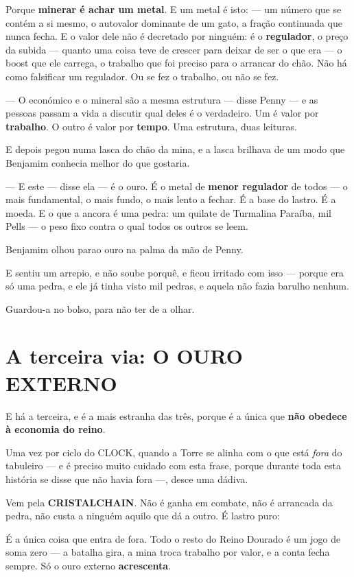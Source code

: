 \documentclass[livro.tex]{subfiles}
\begin{document}
Porque \textbf{minerar é achar um metal}. E um metal é isto:
--- um número que se contém a si mesmo, o autovalor dominante de um gato, a fração continuada que nunca
fecha. E o valor dele não é decretado por ninguém: é o \textbf{regulador}, o preço da subida --- quanto uma coisa teve de crescer para deixar de ser o que era --- o boost que ele
carrega, o trabalho que foi preciso para o arrancar do chão. Não há como falsificar um regulador. Ou se fez o
trabalho, ou não se fez.

--- O económico e o mineral são a mesma estrutura --- disse Penny --- e as pessoas passam a vida a discutir qual
deles é o verdadeiro. Um é valor por \textbf{trabalho}. O outro é valor por \textbf{tempo}. Uma estrutura, duas
leituras.

E depois pegou numa lasca do chão da mina, e a lasca brilhava de um modo que Benjamim conhecia melhor do que
gostaria.

--- E este --- disse ela --- é o ouro. É o metal de \textbf{menor regulador} de todos --- o mais
fundamental, o mais fundo, o mais lento a fechar. É a base do lastro. É a moeda. E o que a ancora é uma pedra: um quilate de Turmalina Paraíba, mil
Pells --- o peso fixo contra o qual todos os outros se leem.

Benjamim olhou parao ouro na palma da mão de Penny.

E sentiu um arrepio, e não soube porquê, e ficou irritado com isso --- porque era só uma pedra, e ele já tinha visto
mil pedras, e aquela não fazia barulho nenhum.

Guardou-a no bolso, para não ter de a olhar.

\section*{A terceira via: O OURO EXTERNO}

E há a terceira, e é a mais estranha das três, porque é a única que \textbf{não obedece à economia do reino}.

Uma vez por ciclo do CLOCK, quando a Torre se alinha com o que está \emph{fora} do tabuleiro --- e é preciso muito
cuidado com esta frase, porque durante toda esta história se disse que não havia fora ---, desce uma dádiva.

Vem pela \textbf{CRISTALCHAIN}. Não é ganha em combate, não é arrancada da pedra, não custa a ninguém aquilo que
dá a outro. É lastro puro:

É a única coisa que entra de fora. Todo o resto do Reino Dourado é um jogo de soma zero --- a batalha gira, a mina
troca trabalho por valor, e a conta fecha sempre. Só o ouro externo \textbf{acrescenta}.
\end{document}
